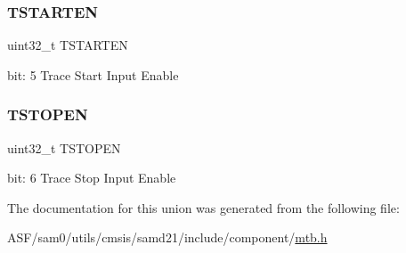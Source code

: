 \subsubsection{\texorpdfstring{TSTARTEN}{TSTARTEN}}
{\footnotesize\ttfamily uint32\+\_\+t T\+S\+T\+A\+R\+T\+EN}

bit\+: 5 Trace Start Input Enable \mbox{\label{union_m_t_b___m_a_s_t_e_r___type_a9fc39c3f468f353bccdba3099c9a1961}} 
\subsubsection{\texorpdfstring{TSTOPEN}{TSTOPEN}}
{\footnotesize\ttfamily uint32\+\_\+t T\+S\+T\+O\+P\+EN}

bit\+: 6 Trace Stop Input Enable 

The documentation for this union was generated from the following file\+:\begin{DoxyCompactItemize}
\item 
A\+S\+F/sam0/utils/cmsis/samd21/include/component/\mbox{\hyperlink{component_2mtb_8h}{mtb.\+h}}\end{DoxyCompactItemize}
